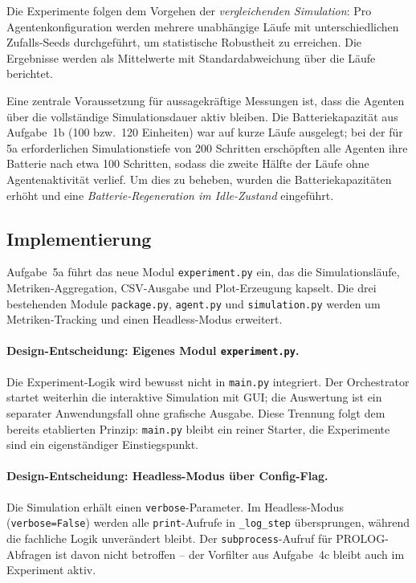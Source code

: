 Die Experimente folgen dem Vorgehen der \textit{vergleichenden Simulation}: Pro Agentenkonfiguration werden mehrere unabhängige Läufe mit unterschiedlichen Zufalls-Seeds durchgeführt, um statistische Robustheit zu erreichen. Die Ergebnisse werden als Mittelwerte mit Standardabweichung über die Läufe berichtet.

Eine zentrale Voraussetzung für aussagekräftige Messungen ist, dass die Agenten über die vollständige Simulationsdauer aktiv bleiben. Die Batteriekapazität aus Aufgabe~1b (100 bzw.\ 120 Einheiten) war auf kurze Läufe ausgelegt; bei der für 5a erforderlichen Simulationstiefe von 200 Schritten erschöpften alle Agenten ihre Batterie nach etwa 100 Schritten, sodass die zweite Hälfte der Läufe ohne Agentenaktivität verlief. Um dies zu beheben, wurden die Batteriekapazitäten erhöht und eine \textit{Batterie-Regeneration im Idle-Zustand} eingeführt.

\subsection{Implementierung}

Aufgabe~5a führt das neue Modul \texttt{experiment.py} ein, das die Simulationsläufe, Metriken-Aggregation, CSV-Ausgabe und Plot-Erzeugung kapselt. Die drei bestehenden Module \texttt{package.py}, \texttt{agent.py} und \texttt{simulation.py} werden um Metriken-Tracking und einen Headless-Modus erweitert.

\paragraph{Design-Entscheidung: Eigenes Modul \texttt{experiment.py}.}
Die Experiment-Logik wird bewusst nicht in \texttt{main.py} integriert. Der Orchestrator startet weiterhin die interaktive Simulation mit \acs{GUI}; die Auswertung ist ein separater Anwendungsfall ohne grafische Ausgabe. Diese Trennung folgt dem bereits etablierten Prinzip: \texttt{main.py} bleibt ein reiner Starter, die Experimente sind ein eigenständiger Einstiegspunkt.

\paragraph{Design-Entscheidung: Headless-Modus über Config-Flag.}
Die Simulation erhält einen \texttt{verbose}-Parameter. Im Headless-Modus (\texttt{verbose=False}) werden alle \texttt{print}-Aufrufe in \texttt{\_log\_step} übersprungen, während die fachliche Logik unverändert bleibt. Der \texttt{subprocess}-Aufruf für \acs{PROLOG}-Abfragen ist davon nicht betroffen -- der Vorfilter aus Aufgabe~4c bleibt auch im Experiment aktiv.

